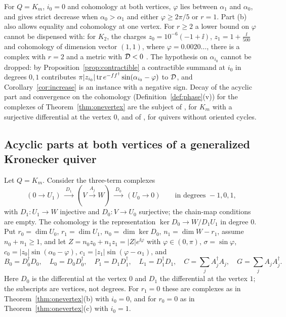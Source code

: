 For $Q=K_m$, $i_0=0$ and cohomology at both vertices, $\varphi$ lies between
$\alpha_1$ and $\alpha_0$, and \cite[Proposition~7.4 and Theorem~7.6]{wue26b} gives strict decrease
when $\alpha_0>\alpha_1$ and either $\varphi\geq2\pi/5$ or $r=1$.
Part (b) also allows equality and cohomology at one vertex. For $r\geq2$ a lower bound on $\varphi$ cannot be dispensed with:
for $K_2$, the charges $z_0=10^{-6}(-1+\ii)$, $z_1=1+\frac\ii{500}$ and
cohomology of dimension vector $(1,1)$, where $\varphi=0.0020\ldots$, there
is a complex with $r=2$ and a metric with $\mathcal D<0$
\cite[Proposition~10.2]{wue26b}. The
hypothesis on $\alpha_{i_0}$ cannot be dropped: by
Proposition~\ref{prop:contractible} a contractible summand at $i_0$ in
degrees $0,1$ contributes
$\pi|z_{i_0}|\operatorname{tr} e^{-ff^\dagger}\sin(\alpha_{i_0}-\varphi)$ to $\mathcal D$, and
Corollary~\ref{cor:increase} is an instance with a negative sign. Decay of
the acyclic part and convergence on the cohomology
(Definition~\ref{def:phase}(v)) for the complexes of
Theorem~\ref{thm:onevertex} are the subject of \cite{wue26b}, for $K_m$ with
a surjective differential at the vertex $0$, and of \cite{wue26c}, for
quivers without oriented cycles.

\subsection{Acyclic parts at both vertices of a generalized Kronecker quiver}
Let $Q=K_m$. Consider the three-term complexes
\begin{equation}\label{eq:twosided}
 (0\to U_1)\ \xrightarrow{\ D_1\ }\ (V\xrightarrow{A_j}W)\ \xrightarrow{\ D_0\ }\ (U_0\to0)
 \qquad\text{in degrees }-1,0,1,
\end{equation}
with $D_1:U_1\to W$ injective and $D_0:V\to U_0$ surjective; the chain-map
conditions are empty. The cohomology is the representation
$\ker D_0\to W/D_1U_1$ in degree $0$. Put $r_0=\dim U_0$, $r_1=\dim U_1$,
$n_0=\dim\ker D_0$, $n_1=\dim W-r_1$, assume $n_0+n_1\geq1$, and let
$Z=n_0z_0+n_1z_1=|Z|e^{\ii\varphi}$ with $\varphi\in(0,\pi)$,
$\sigma=\sin\varphi$, $c_0=|z_0|\sin(\alpha_0-\varphi)$,
$c_1=|z_1|\sin(\varphi-\alpha_1)$, and
\[
 B_0=D_0^\dagger D_0,\quad L_0=D_0D_0^\dagger,\quad P_1=D_1D_1^\dagger,\quad
 L_1=D_1^\dagger D_1,\quad C=\sum_jA_j^\dagger A_j,\quad G=\sum_jA_jA_j^\dagger .
\]
Here $D_0$ is the differential at the vertex $0$ and $D_1$ the differential
at the vertex $1$; the subscripts are vertices, not degrees. For $r_1=0$
these are complexes as in Theorem~\ref{thm:onevertex}(b) with $i_0=0$, and
for $r_0=0$ as in Theorem~\ref{thm:onevertex}(c) with $i_0=1$.

